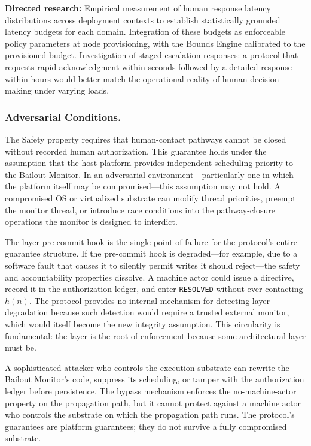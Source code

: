 \medskip\noindent\textbf{Directed research:} Empirical measurement of human response latency distributions across deployment contexts to establish statistically grounded latency budgets for each domain. Integration of these budgets as enforceable policy parameters at node provisioning, with the Bounds Engine calibrated to the provisioned budget. Investigation of staged escalation responses: a protocol that requests rapid acknowledgment within seconds followed by a detailed response within hours would better match the operational reality of human decision-making under varying loads.

\subsubsection{Adversarial Conditions.}
The Safety property requires that human-contact pathways cannot be closed without recorded human authorization. This guarantee holds under the assumption that the host platform provides independent scheduling priority to the Bailout Monitor. In an adversarial environment---particularly one in which the platform itself may be compromised---this assumption may not hold. A compromised OS or virtualized substrate can modify thread priorities, preempt the monitor thread, or introduce race conditions into the pathway-closure operations the monitor is designed to interdict.

The \fact{} layer pre-commit hook is the single point of failure for the protocol's entire guarantee structure. If the pre-commit hook is degraded---for example, due to a software fault that causes it to silently permit writes it should reject---the safety and accountability properties dissolve. A machine actor could issue a directive, record it in the authorization ledger, and enter \texttt{RESOLVED} without ever contacting $h(n)$. The protocol provides no internal mechanism for detecting \fact{} layer degradation because such detection would require a trusted external monitor, which would itself become the new integrity assumption. This circularity is fundamental: the \fact{} layer is the root of enforcement because some architectural layer must be.

A sophisticated attacker who controls the execution substrate can rewrite the Bailout Monitor's code, suppress its scheduling, or tamper with the authorization ledger before persistence. The bypass mechanism enforces the no-machine-actor property on the propagation path, but it cannot protect against a machine actor who controls the substrate on which the propagation path runs. The protocol's guarantees are platform guarantees; they do not survive a fully compromised substrate.


